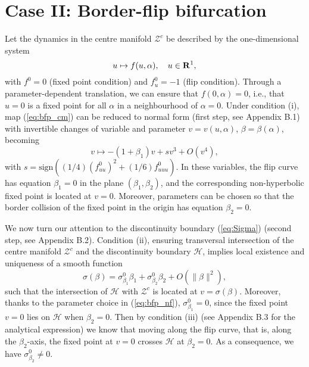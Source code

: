 \documentclass[final,onefignum]{siamltex}
\begin{document}
\section{Case II: Border-flip bifurcation}
\label{sec:bfp}
Let the dynamics in the centre manifold $\mathcal{Z}^c$ be described by the
one-dimensional system
\begin{equation}
\label{eq:bfp_cm}
u \mapsto f(u,\alpha), \quad u\in{{\bf R}}^1,
\end{equation}
with $f^0=0$ (fixed point condition) and $f_u^0=-1$ (flip condition).  Through a parameter-dependent translation, we can ensure that $f(0,\alpha)=0$, i.e., that $u=0$ is a fixed point for all $\alpha$ in a neighbourhood of $\alpha=0$.   Under condition (i), map (\ref{eq:bfp_cm}) can be reduced to normal form (first step, see Appendix B.1) with invertible changes of variable and parameter  $v=v(u,\alpha)$, $\beta=\beta(\alpha)$, becoming
\begin{equation}
\label{eq:bfp_nf}
v\mapsto-(1+\beta_1)v + sv^3+O(v^4),
\end{equation}
with $s=\mathrm{sign}((1/4)(f^0_{uu})^2+(1/6)f^0_{uuu})$.  In these variables, the flip curve has equation $\beta_1=0$ in the plane $(\beta_1,\beta_2)$, and the corresponding non-hyperbolic fixed point is located at $v=0$.  Moreover, parameters can be chosen so that the border collision of the fixed point in the origin has equation $\beta_2=0$.

We now turn our attention to the discontinuity boundary (\ref{eq:Sigma}) (second step, see Appendix B.2).
Condition (ii), ensuring transversal intersection of the centre manifold $\mathcal{Z}^c$ and the discontinuity boundary $\mathcal{H}$, implies local existence and uniqueness of a smooth function
$$
\sigma(\beta)=\sigma_{\beta_1}^0\beta_1+\sigma_{\beta_2}^0\beta_2+
O(\|\beta\|^2),
$$
such that the intersection of $\mathcal{H}$ with $\mathcal{Z}^c$ is located at $v=\sigma(\beta)$.  Moreover, thanks to the parameter choice in (\ref{eq:bfp_nf}), $\sigma_{\beta_1}^0=0$, since the fixed point $v=0$ lies on $\mathcal{H}$ when $\beta_2=0$.  Then by condition (iii) (see Appendix B.3 for the analytical expression) we know that moving along the flip curve, that is, along the $\beta_2$-axis, the fixed point at $v=0$ crosses $\mathcal{H}$ at $\beta_2=0$.  As a consequence, we have $\sigma_{\beta_2}^0\neq0$.
\end{document}
